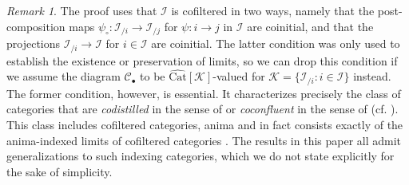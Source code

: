 \documentclass[a4paper,reqno,10pt]{amsart}
\theoremstyle{definition}
\theoremstyle{remark}
\newtheorem{remark}[theorem]{Remark}
\newcommand{\sqb}[1]{\left\lbrack #1\right\rbrack}
\newcommand{\C}{\mathcal{C}}
\newcommand{\I}{\mathcal{I}}
\newcommand{\K}{\mathcal{K}}
\newcommand{\Cat}{\mathrm{Cat}}
\begin{document}
\begin{remark}
The proof uses that $\I$ is cofiltered in two ways, namely that the post-composition maps $\psi_{\circ}\colon\I_{/i}\rightarrow\I_{/j}$ for $\psi\colon i\rightarrow j$ in $\I$ are coinitial, and that the projections $\I_{/i}\rightarrow\I$ for $i\in\I$ are coinitial. The latter condition was only used to establish the existence or preservation of limits, so we can drop this condition if we assume the diagram $\C_{\bullet}$ to be $\widehat{\Cat}\sqb{\K}$-valued for $\K=\{\I_{/i}\colon i\in\I\}$ instead. The former condition, however, is essential. It characterizes precisely the class of categories that are \textit{codistilled} in the sense of \cite[Section 4]{Rezk} or \textit{coconfluent} in the sense of \cite{SattlerWärn} (cf. \cite[Section 9.8]{HaugsengYetAnother}). This class includes cofiltered categories, anima and in fact consists exactly of the anima-indexed limits of cofiltered categories \cite[Corollary 16.9]{Rezk}. The results in this paper all admit generalizations to such indexing categories, which we do not state explicitly for the sake of simplicity.
\end{remark}
\end{document}
